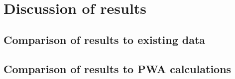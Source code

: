 \chapter{Discussion of results}
\section{Comparison of results to existing data}

\section{Comparison of results to PWA calculations}
